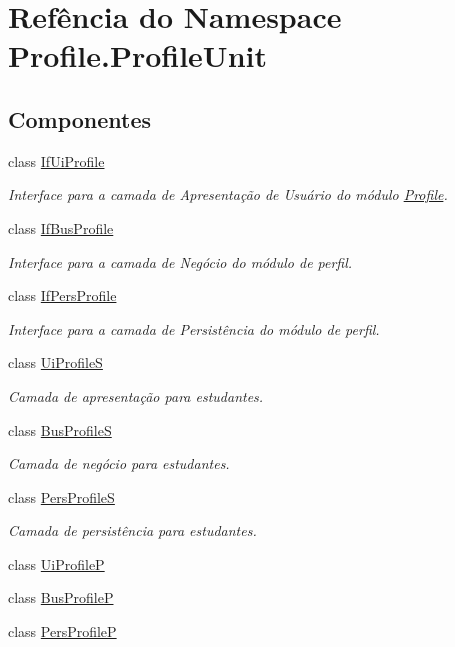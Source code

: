 \hypertarget{namespaceProfile_1_1ProfileUnit}{\section{Refência do Namespace Profile.\-Profile\-Unit}
\label{namespaceProfile_1_1ProfileUnit}
}
\subsection*{Componentes}
\begin{DoxyCompactItemize}
\item 
class \hyperlink{classProfile_1_1ProfileUnit_1_1IfUiProfile}{If\-Ui\-Profile}
\begin{DoxyCompactList}\small\item\em Interface para a camada de Apresentação de Usuário do módulo \hyperlink{namespaceProfile}{Profile}. \end{DoxyCompactList}\item 
class \hyperlink{classProfile_1_1ProfileUnit_1_1IfBusProfile}{If\-Bus\-Profile}
\begin{DoxyCompactList}\small\item\em Interface para a camada de Negócio do módulo de perfil. \end{DoxyCompactList}\item 
class \hyperlink{classProfile_1_1ProfileUnit_1_1IfPersProfile}{If\-Pers\-Profile}
\begin{DoxyCompactList}\small\item\em Interface para a camada de Persistência do módulo de perfil. \end{DoxyCompactList}\item 
class \hyperlink{classProfile_1_1ProfileUnit_1_1UiProfileS}{Ui\-Profile\-S}
\begin{DoxyCompactList}\small\item\em Camada de apresentação para estudantes. \end{DoxyCompactList}\item 
class \hyperlink{classProfile_1_1ProfileUnit_1_1BusProfileS}{Bus\-Profile\-S}
\begin{DoxyCompactList}\small\item\em Camada de negócio para estudantes. \end{DoxyCompactList}\item 
class \hyperlink{classProfile_1_1ProfileUnit_1_1PersProfileS}{Pers\-Profile\-S}
\begin{DoxyCompactList}\small\item\em Camada de persistência para estudantes. \end{DoxyCompactList}\item 
class \hyperlink{classProfile_1_1ProfileUnit_1_1UiProfileP}{Ui\-Profile\-P}
\item 
class \hyperlink{classProfile_1_1ProfileUnit_1_1BusProfileP}{Bus\-Profile\-P}
\item 
class \hyperlink{classProfile_1_1ProfileUnit_1_1PersProfileP}{Pers\-Profile\-P}
\end{DoxyCompactItemize}
